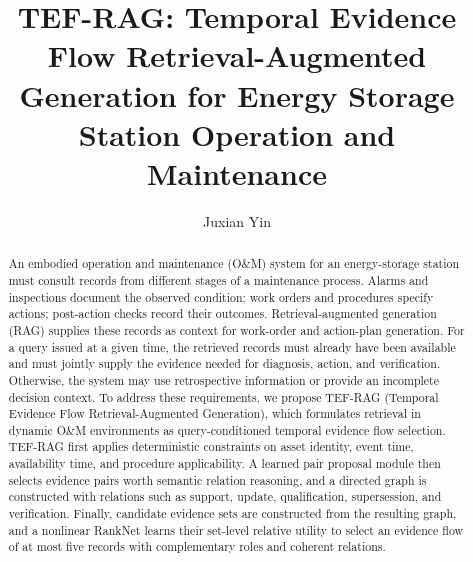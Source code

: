 \documentclass[letterpaper,10pt,conference]{IEEEtran}
\title{TEF-RAG: Temporal Evidence Flow Retrieval-Augmented Generation for Energy Storage Station Operation and Maintenance}
\author{Juxian Yin}
\begin{document}
\maketitle

\begin{abstract}
An embodied operation and maintenance (O\&M) system for an energy-storage station must consult records from different stages of a maintenance process. Alarms and inspections document the observed condition; work orders and procedures specify actions; post-action checks record their outcomes. Retrieval-augmented generation (RAG) supplies these records as context for work-order and action-plan generation.
For a query issued at a given time, the retrieved records must already have been available and must jointly supply the evidence needed for diagnosis, action, and verification. Otherwise, the system may use retrospective information or provide an incomplete decision context.
To address these requirements, we propose TEF-RAG (Temporal Evidence Flow Retrieval-Augmented Generation), which formulates retrieval in dynamic O\&M environments as query-conditioned temporal evidence flow selection.
% 
TEF-RAG first applies deterministic constraints on asset identity, event time, availability time, 
and procedure applicability. 
% 
A learned pair proposal module then selects evidence pairs worth semantic relation reasoning, and a directed graph is constructed with relations such as support, update, qualification, supersession, and verification. 
% 
Finally, candidate evidence sets are constructed from the resulting graph, and a nonlinear RankNet learns their set-level relative utility to select an evidence flow of at most five records with complementary roles and coherent relations.

\end{abstract}
\end{document}
